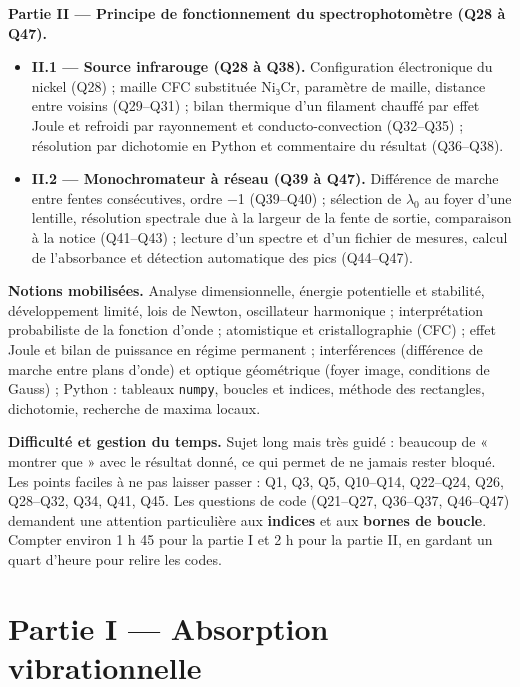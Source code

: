 \documentclass[11pt,a4paper]{article}
\providecommand{\tightlist}{\setlength{\itemsep}{0pt}\setlength{\parskip}{0pt}}
\begin{document}
\textbf{Partie II --- Principe de fonctionnement du spectrophotomètre (Q28 à Q47).}

\begin{itemize}
\tightlist
\item
  \textbf{II.1 --- Source infrarouge (Q28 à Q38).} Configuration électronique du nickel (Q28) ; maille CFC substituée Ni₃Cr, paramètre de maille, distance entre voisins (Q29--Q31) ; bilan thermique d'un filament chauffé par effet Joule et refroidi par rayonnement et conducto-convection (Q32--Q35) ; résolution par dichotomie en Python et commentaire du résultat (Q36--Q38).
\item
  \textbf{II.2 --- Monochromateur à réseau (Q39 à Q47).} Différence de marche entre fentes consécutives, ordre −1 (Q39--Q40) ; sélection de \(\lambda_0\) au foyer d'une lentille, résolution spectrale due à la largeur de la fente de sortie, comparaison à la notice (Q41--Q43) ; lecture d'un spectre et d'un fichier de mesures, calcul de l'absorbance et détection automatique des pics (Q44--Q47).
\end{itemize}

\textbf{Notions mobilisées.} Analyse dimensionnelle, énergie potentielle et stabilité, développement limité, lois de Newton, oscillateur harmonique ; interprétation probabiliste de la fonction d'onde ; atomistique et cristallographie (CFC) ; effet Joule et bilan de puissance en régime permanent ; interférences (différence de marche entre plans d'onde) et optique géométrique (foyer image, conditions de Gauss) ; Python : tableaux \texttt{numpy}, boucles et indices, méthode des rectangles, dichotomie, recherche de maxima locaux.

\textbf{Difficulté et gestion du temps.} Sujet long mais très guidé : beaucoup de « montrer que » avec le résultat donné, ce qui permet de ne jamais rester bloqué. Les points faciles à ne pas laisser passer : Q1, Q3, Q5, Q10--Q14, Q22--Q24, Q26, Q28--Q32, Q34, Q41, Q45. Les questions de code (Q21--Q27, Q36--Q37, Q46--Q47) demandent une attention particulière aux \textbf{indices} et aux \textbf{bornes de boucle}. Compter environ 1 h 45 pour la partie I et 2 h pour la partie II, en gardant un quart d'heure pour relire les codes.

\hypertarget{partie-i-absorption-vibrationnelle}{%
\section{Partie I --- Absorption vibrationnelle}\label{partie-i-absorption-vibrationnelle}}
\end{document}

